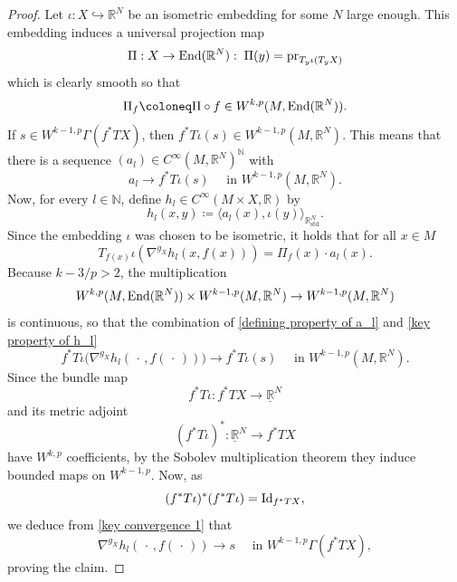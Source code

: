 \documentclass[11pt,a4paper]{article}
\theoremstyle{definition}
\newcommand{\End}{\textnormal{End}}
\newcommand{\pr}{\textnormal{pr}}
\newcommand{\id}{\textnormal{Id}}
\newcommand{\bN}{\mathbb{N}}
\newcommand{\bR}{\mathbb{R}}
\begin{document}
\begin{proof}
  Let $\iota: X \hookrightarrow \bR^N$ be an isometric embedding for some $N$ large enough. This embedding induces a universal projection map
  \begin{equation*}
    \Pi: X \to \End (\bR^N): \; \Pi(y) = \pr_{T_y \iota (T_y X)}
  \end{equation*}
  which is clearly smooth so that 
  \begin{equation*}
    \Pi_f \coloneq \Pi \circ f \in W^{k,p}(M, \End (\bR^N)).
  \end{equation*}
  If $s \in W^{k-1, p}\Gamma(f^*TX)$, then $f^*T\iota(s)\in W^{k-1, p}(M, \bR^N)$. This means that there is a sequence $(a_l)\in C^\infty(M, \bR^N)^\bN$ with 
  \begin{equation}\label{defining property of a_l}
    a_l  \to f^*T\iota(s) \quad \text{ in } W^{k-1, p}(M, \bR^N).
  \end{equation}
  Now, for every $l \in \bN$, define $h_l \in C^\infty(M\times X, \bR)$ by
  \begin{equation*}
    h_l(x, y) \coloneq \langle a_l(x), \iota(y) \rangle_{\bR^N_{\text{std}}}.
  \end{equation*}
  Since the embedding $\iota$ was chosen to be isometric, it holds that for all $x \in M$
  \begin{equation}\label{key property of h_l}
    T_{f(x)} \iota (\nabla^{g_X} h_l (x, f(x))) = \Pi_f (x) \cdot a_l(x).
  \end{equation} 
  Because $k-3/p>2$, the multiplication
  \begin{equation*}
    W^{k, p}(M, \End(\bR^N)) \times W^{k-1, p}(M, \bR^N) \to W^{k-1, p}(M, \bR^N)
  \end{equation*}
  is continuous, so that the combination of \eqref{defining property of a_l} and \eqref{key property of h_l}
  \begin{equation}\label{key convergence 1}
    f^*T \iota \Big( \nabla^{g_X} h_l( \, \cdot \, , f(\, \cdot \, ))\Big) \to f^*T \iota (s) \quad \text{ in } W^{k-1, p}(M, \bR^N).
  \end{equation}
  Since the bundle map 
  \begin{equation*}
    f^*T \iota: f^*TX \to \underline{\bR}^N
  \end{equation*}
  and its metric adjoint
  \begin{equation*}
    (f^*T \iota)^*: \underline{\bR}^N \to f^*TX
  \end{equation*} 
  have $W^{k,p}$ coefficients, by the Sobolev multiplication theorem they induce bounded maps on $W^{k-1,p}$. Now, as
  \begin{equation*}
    (f^*T \iota)^* (f^*T \iota )= \id_{f^*TX},
  \end{equation*} 
  we deduce from \eqref{key convergence 1} that 
  \begin{equation*}
    \nabla^{g_X} h_l( \, \cdot \, , f(\, \cdot \, )) \to s \quad \text{ in } W^{k-1, p}\Gamma(f^*TX),
  \end{equation*}
  proving the claim.
\end{proof}
\end{document}
